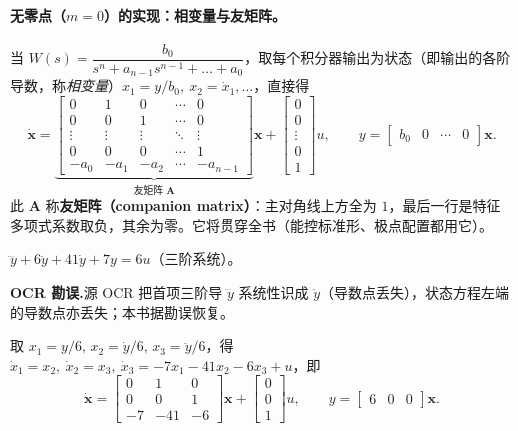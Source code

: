\paragraph{无零点（$m=0$）的实现：相变量与友矩阵。}
当 $W(s)=\dfrac{b_0}{s^n+a_{n-1}s^{n-1}+\dots+a_0}$，取每个积分器输出为状态（即输出的各阶导数，称\emph{相变量}）$x_1=y/b_0,\ x_2=\dot x_1,\dots$，直接得
\begin{equation}
  \dot{\mathbf{x}}=\underbrace{\begin{bmatrix}
    0&1&0&\cdots&0\\ 0&0&1&\cdots&0\\
    \vdots&\vdots&\vdots&\ddots&\vdots\\ 0&0&0&\cdots&1\\
    -a_0&-a_1&-a_2&\cdots&-a_{n-1}
  \end{bmatrix}}_{\text{友矩阵 }\mathbf{A}}\mathbf{x}
  +\begin{bmatrix}0\\0\\\vdots\\0\\1\end{bmatrix}u,
  \qquad y=\begin{bmatrix}b_0&0&\cdots&0\end{bmatrix}\mathbf{x}.
  \label{eq:ssb-companion}
\end{equation}
此 $\mathbf{A}$ 称\textbf{友矩阵（companion matrix）}：主对角线上方全为 $1$，最后一行是特征多项式系数取负，其余为零。它将贯穿全书（能控标准形、极点配置都用它）。

\begin{example}[$m=0$ 实现]\label{ex:ssb-companion}
$\dddot y+6\ddot y+41\dot y+7y=6u$（三阶系统）。
\begin{note}\textbf{OCR 勘误.}\;源 OCR 把首项三阶导 $\dddot y$ 系统性识成 $\ddot y$（导数点丢失），状态方程左端的导数点亦丢失；本书据勘误恢复\cite{liubao2006modern}。\end{note}
取 $x_1=y/6,\,x_2=\dot y/6,\,x_3=\ddot y/6$，得 $\dot x_1=x_2,\ \dot x_2=x_3,\ \dot x_3=-7x_1-41x_2-6x_3+u$，即
\[
  \dot{\mathbf{x}}=\begin{bmatrix}0&1&0\\0&0&1\\-7&-41&-6\end{bmatrix}\mathbf{x}+\begin{bmatrix}0\\0\\1\end{bmatrix}u,\qquad y=\begin{bmatrix}6&0&0\end{bmatrix}\mathbf{x}.
\]
\end{example}

